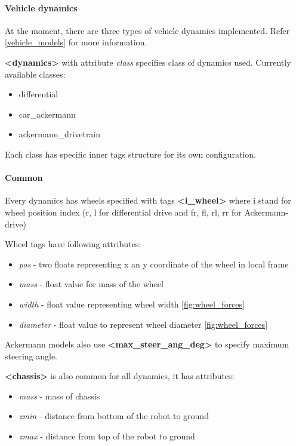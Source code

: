 \documentclass[a4paper,11pt]{article}
\begin{document}
\paragraph{Vehicle dynamics}
At the moment, there are three types of vehicle dynamics implemented. Refer  \ref{vehicle_models} for more information.

\textbf{\textless dynamics\textgreater} with attribute \textit{class} specifies class of dynamics used. Currently available classes:
\begin{itemize}
	\item differential
	\item car\_ackermann
	\item ackermann\_drivetrain
\end{itemize}

Each class has specific inner tags structure for its own configuration.

\paragraph{Common} Every dynamics has wheels specified with tags \textbf{\textless i\_wheel\textgreater} where i stand for wheel position index (r, l for differential drive and fr, fl, rl, rr for Ackermann-drive)

Wheel tags have following attributes:
\begin{itemize}
	\item \textit{pos} - two floats representing x an y coordinate of the wheel in local frame
	\item \textit{mass} - float value for mass of the wheel
	\item \textit{width} - float value representing wheel width \ref{fig:wheel_forces}
	\item \textit{diameter} - float value to represent wheel diameter \ref{fig:wheel_forces}
\end{itemize}

Ackermann models also use \textbf{\textless max\_steer\_ang\_deg\textgreater} to specify maximum steering angle.


\textbf{\textless chassis\textgreater} is also common for all dynamics, it has attributes:

\begin{itemize}
	\item \textit{mass} - mass of chassis
	\item \textit{zmin} - distance from bottom of the robot to ground
	\item \textit{zmax} - distance from top of the robot to ground
\end{itemize}
\end{document}
